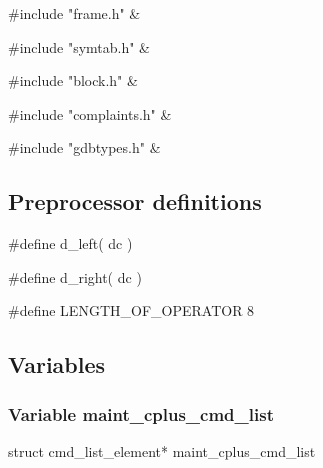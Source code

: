 \medskip
\begin{cxreftabi}
{\stt \#include "frame.h"} &\\
\end{cxreftabi}

\medskip
\begin{cxreftabi}
{\stt \#include "symtab.h"} &\\
\end{cxreftabi}

\medskip
\begin{cxreftabi}
{\stt \#include "block.h"} &\\
\end{cxreftabi}

\medskip
\begin{cxreftabi}
{\stt \#include "complaints.h"} &\\
\end{cxreftabi}

\medskip
\begin{cxreftabi}
{\stt \#include "gdbtypes.h"} &\\
\end{cxreftabi}


\subsection*{Preprocessor definitions}

{\stt \#define d\_left( dc )}

\medskip
{\stt \#define d\_right( dc )}

\medskip
{\stt \#define LENGTH\_OF\_OPERATOR 8}


\subsection{Variables}


\subsubsection{Variable maint\_cplus\_cmd\_list}
\label{var_maint_cplus_cmd_list_cp-support.c}

{\stt struct cmd\_list\_element* maint\_cplus\_cmd\_list}

